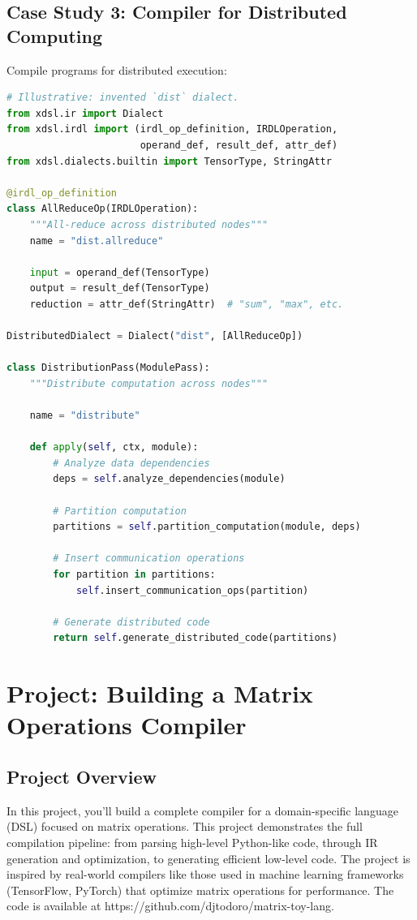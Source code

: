 \documentclass[11pt,a4paper]{article}
\begin{document}
\subsection{Case Study 3: Compiler for Distributed Computing}

Compile programs for distributed execution:

\begin{lstlisting}[language=Python, caption=Distributed Computing Compiler]
# Illustrative: invented `dist` dialect.
from xdsl.ir import Dialect
from xdsl.irdl import (irdl_op_definition, IRDLOperation,
                       operand_def, result_def, attr_def)
from xdsl.dialects.builtin import TensorType, StringAttr

@irdl_op_definition
class AllReduceOp(IRDLOperation):
    """All-reduce across distributed nodes"""
    name = "dist.allreduce"

    input = operand_def(TensorType)
    output = result_def(TensorType)
    reduction = attr_def(StringAttr)  # "sum", "max", etc.

DistributedDialect = Dialect("dist", [AllReduceOp])

class DistributionPass(ModulePass):
    """Distribute computation across nodes"""

    name = "distribute"

    def apply(self, ctx, module):
        # Analyze data dependencies
        deps = self.analyze_dependencies(module)

        # Partition computation
        partitions = self.partition_computation(module, deps)

        # Insert communication operations
        for partition in partitions:
            self.insert_communication_ops(partition)

        # Generate distributed code
        return self.generate_distributed_code(partitions)
\end{lstlisting}

\section{Project: Building a Matrix Operations Compiler}

\subsection{Project Overview}

In this project, you'll build a complete compiler for a domain-specific language (DSL) focused on matrix operations. This project demonstrates the full compilation pipeline: from parsing high-level Python-like code, through IR generation and optimization, to generating efficient low-level code. The project is inspired by real-world compilers like those used in machine learning frameworks (TensorFlow, PyTorch) that optimize matrix operations for performance. The code is available at https://github.com/djtodoro/matrix-toy-lang.
\end{document}
